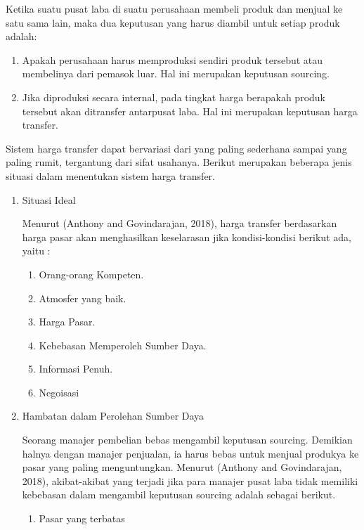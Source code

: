 \begin{spacing}{1.5}
Ketika suatu pusat laba di suatu perusahaan membeli produk dan menjual ke satu sama lain, maka dua keputusan yang harus diambil untuk setiap produk adalah:

\begin{enumerate}
	\item Apakah perusahaan harus memproduksi sendiri produk tersebut atau membelinya dari pemasok luar. Hal ini merupakan keputusan sourcing.

	\item Jika diproduksi secara internal, pada tingkat harga berapakah produk tersebut akan ditransfer antarpusat laba. Hal ini merupakan keputusan harga transfer.
\end{enumerate}

Sistem harga transfer dapat bervariasi dari yang paling sederhana sampai yang paling rumit, tergantung dari sifat usahanya. Berikut merupakan beberapa jenis situasi dalam menentukan sistem harga transfer.

\begin{enumerate}
	\item Situasi Ideal
	
	Menurut (Anthony and Govindarajan, 2018), harga transfer berdasarkan harga pasar akan menghasilkan keselarasan jika kondisi-kondisi berikut ada, yaitu :

	\begin{enumerate}
		\item Orang-orang Kompeten.
		\item Atmosfer yang baik.
		\item Harga Pasar.
		\item Kebebasan Memperoleh Sumber Daya.
		\item Informasi Penuh.
		\item Negoisasi
	\end{enumerate}

	\item Hambatan dalam Perolehan Sumber Daya
	
	Seorang manajer pembelian bebas mengambil keputusan sourcing. Demikian halnya dengan manajer penjualan, ia harus bebas untuk menjual produkya ke pasar yang paling menguntungkan. Menurut (Anthony and Govindarajan, 2018), akibat-akibat yang terjadi jika para manajer pusat laba tidak memiliki kebebasan dalam mengambil keputusan sourcing adalah sebagai berikut.

	\begin{enumerate}
		\item Pasar yang terbatas
		

\end{enumerate}
\end{enumerate}
\end{spacing}
